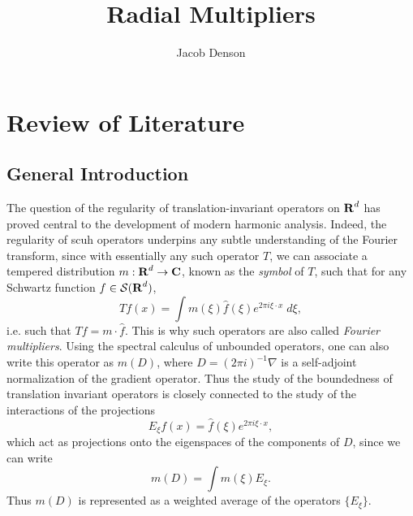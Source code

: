     

\title{Radial Multipliers}
\author{Jacob Denson}



\maketitle

\tableofcontents

\newpage

\part{Review of Literature}

\chapter{General Introduction}

The question of the regularity of translation-invariant operators on $\operatorname{\mathbf{R}}^d$ has proved central to the development of modern harmonic analysis. Indeed, the regularity of scuh operators underpins any subtle understanding of the Fourier transform, since with essentially any such operator $T$, we can associate a tempered distribution $m: \operatorname{\mathbf{R}}^d \to \operatorname{\mathbf{C}}$, known as the \emph{symbol} of $T$, such that for any Schwartz function $f \in \mathcal{S}(\operatorname{\mathbf{R}}^d)$,
%
\[ Tf(x) = \int m(\xi) \widehat{f}(\xi) e^{2 \pi i \xi \cdot x}\; d\xi, \]
%
i.e. such that $\widehat{Tf} = m \cdot \widehat{f}$. This is why such operators are also called \emph{Fourier multipliers}. Using the spectral calculus of unbounded operators, one can also write this operator as $m(D)$, where $D = (2 \pi i)^{-1} \nabla$ is a self-adjoint normalization of the gradient operator. Thus the study of the boundedness of translation invariant operators is closely connected to the study of the interactions of the projections
%
\[ E_\xi f(x) = \widehat{f}(\xi) e^{2 \pi i \xi \cdot x}, \]
%
which act as projections onto the eigenspaces of the components of $D$, since we can write
%
\[ m(D) = \int m(\xi) E_\xi. \]
%
Thus $m(D)$ is represented as a weighted average of the operators $\{ E_\xi \}$.

